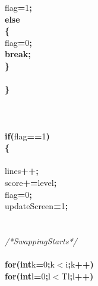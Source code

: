 \documentclass[a4paper, 10pt]{article}
\newcommand\SPC{\hspace*{0.6em}}
\newcommand{\CppAComment}[1]{\textit{\textcolor[rgb]{0.2,0.6,1}{#1}}}
\newcommand{\CppAIdentifier}[1]{#1}
\newcommand{\CppANumber}[1]{\textcolor[rgb]{0.5,0,0.5}{#1}}
\newcommand{\CppAReservedWord}[1]{\textbf{#1}}
\newcommand{\CppASpace}[1]{\colorbox[rgb]{1,1,1}{#1}}
\newcommand{\CppASymbol}[1]{\textbf{\textcolor[rgb]{1,0,0}{#1}}}
\begin{document}
\begin{ttfamily}
\CppASpace{\SPC \SPC \SPC \SPC }\CppAIdentifier{flag}\CppASymbol{=}\CppANumber{1}\CppASymbol{;}\\
\CppASpace{\SPC \SPC \SPC }\CppAReservedWord{else}\\
\CppASpace{\SPC \SPC \SPC }\CppASymbol{\{}\\
\CppASpace{\SPC \SPC \SPC \SPC }\CppAIdentifier{flag}\CppASymbol{=}\CppANumber{0}\CppASymbol{;}\\
\CppASpace{\SPC \SPC \SPC \SPC }\CppAReservedWord{break}\CppASymbol{;}\\
\CppASpace{\SPC \SPC \SPC }\CppASymbol{\}}\\
\\
\CppASpace{\SPC \SPC }\CppASymbol{\}}\\
\\
\\
\\
\CppASpace{\SPC \SPC }\CppAReservedWord{if}\CppASymbol{(}\CppAIdentifier{flag}\CppASymbol{==}\CppANumber{1}\CppASymbol{)}\\
\CppASpace{\SPC \SPC }\CppASymbol{\{}\\
\\
\CppASpace{\SPC \SPC }\CppAIdentifier{lines}\CppASymbol{++}\CppASymbol{;}\\
\CppASpace{\SPC \SPC }\CppAIdentifier{score}\CppASymbol{+=}\CppAIdentifier{level}\CppASymbol{;}\\
\CppASpace{\SPC \SPC \SPC \SPC \SPC }\CppAIdentifier{flag}\CppASymbol{=}\CppANumber{0}\CppASymbol{;}\\
\CppASpace{\SPC \SPC }\CppAIdentifier{updateScreen}\CppASymbol{=}\CppANumber{1}\CppASymbol{;}\\
\\
\\
\CppASpace{\SPC \SPC \SPC }\CppAComment{/*\SPC Swapping\SPC Starts\SPC */}\\
\\
\CppASpace{\SPC \SPC \SPC }\CppAReservedWord{for}\CppASymbol{(}\CppAReservedWord{int}\CppASpace{\SPC }\CppAIdentifier{k}\CppASymbol{=}\CppANumber{0}\CppASymbol{;}\CppAIdentifier{k}\CppASymbol{$<$}\CppAIdentifier{i}\CppASymbol{;}\CppAIdentifier{k}\CppASymbol{++}\CppASymbol{)}\\
\CppASpace{\SPC \SPC \SPC \SPC }\CppAReservedWord{for}\CppASymbol{(}\CppAReservedWord{int}\CppASpace{\SPC }\CppAIdentifier{l}\CppASymbol{=}\CppANumber{0}\CppASymbol{;}\CppAIdentifier{l}\CppASymbol{$<$}\CppAIdentifier{Tl}\CppASymbol{;}\CppAIdentifier{l}\CppASymbol{++}\CppASymbol{)}\\

\end{ttfamily}
\end{document}

